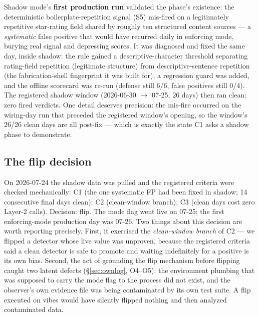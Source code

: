 \documentclass[11pt]{article}
\begin{document}
Shadow mode's \textbf{first production run} validated the phase's
existence: the deterministic boilerplate-repetition signal (S5)
mis-fired on a legitimately repetitive star-rating field shared by
roughly ten structured content sources --- a \emph{systematic} false
positive that would have recurred daily in enforcing mode, burying real
signal and depressing scores. It was diagnosed and fixed the same day,
inside shadow: the rule gained a descriptive-character threshold
separating rating-field repetition (legitimate structure) from
descriptive-sentence repetition (the fabrication-shell fingerprint it
was built for), a regression guard was added, and the offline scorecard
was re-run (defense still 6/6, false positives still 0/4). The
registered shadow window (2026-06-30 $\rightarrow$ 07-25, 26 days) then
ran clean: zero fired verdicts. One detail deserves precision: the
mis-fire occurred on the wiring-day run that preceded the registered
window's opening, so the window's 26/26 clean days are all
post-fix --- which is exactly the state C1 asks a shadow phase to
demonstrate.

\subsection{The flip decision}
\label{sec:flip}

On 2026-07-24 the shadow data was pulled and the registered criteria
were checked mechanically: C1 \checkmark{} (the one systematic FP had
been fixed in shadow; 14 consecutive final days clean); C2 \checkmark{}
(clean-window branch); C3 \checkmark{} (clean days cost zero Layer-2
calls). Decision: flip. The mode flag went live on 07-25; the first
enforcing-mode production day was 07-26. Two things about this decision
are worth reporting precisely. First, it exercised the
\emph{clean-window branch} of C2 --- we flipped a detector whose live
value was unproven, because the registered criteria said a clean
detector is safe to promote and waiting indefinitely for a positive is
its own bias. Second, the act of grounding the flip mechanism before
flipping caught two latent defects (\S\ref{sec:ownlog}, O4--O5): the
environment plumbing that was supposed to carry the mode flag to the
process did not exist, and the observer's own evidence file was being
contaminated by its own test suite. A flip executed on vibes would have
silently flipped nothing and then analyzed contaminated data.
\end{document}
